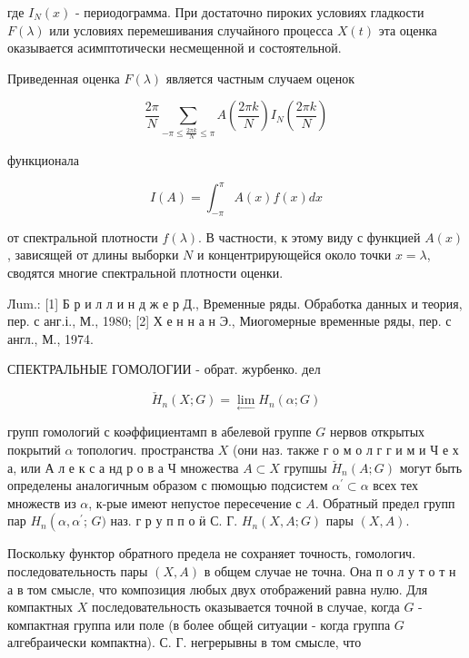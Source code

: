 \documentclass[10pt]{article}
\begin{document}
где $I_{N}(x)$ - периодограмма. При достаточно пироких условиях гладкости $F(\lambda)$ или условиях перемешивания случайного процесса $X(t)$ эта оценка оказывается асимптотически несмещенной и состоятельной.



Приведенная оценка $F(\lambda)$ является частным случаем оценок



\[

\frac{2 \pi}{N} \sum_{-\pi \leqslant \frac{2 \pi k}{N} \leqslant \pi} A\left(\frac{2 \pi k}{N}\right) I_{N}\left(\frac{2 \pi k}{N}\right)

\]



функционала



\[

I(A)=\int_{-\pi}^{\pi} A(x) f(x) d x

\]



от спектральной плотности $f(\lambda)$. В частности, к этому виду с функцией $A(x)$, зависящей от длины выборки $N$ и концентрирующейся около точки $x=\lambda$, сводятся многие спектральной плотности оценки.



Лum.: [1] Б р и л л и н д ж е р Д., Временные ряды. Обработка данных и теория, пер. с анг.і., М., 1980; [2] Х е н н а н Э., Миогомерные временные ряды, пер. с англ., М., 1974.



СПЕКТРАЛЬНЫЕ ГОМОЛОГИИ - обрат. журбенко. дел



\[

\check{H}_{n}(X ; G)=\lim _{\longleftarrow} H_{n}(\alpha ; G)

\]



групп гомологий с коәффициентамп в абелевой группе $G$ нервов открытых покрытий $\alpha$ топологич. пространства $X$ (они наз. также г о м о л г г и м и Ч е х а, или А л е к с а нд р о в а Ч множества $A \subset X$ групшы $\breve{H}_{n}(A ; G)$ могут быть определены аналогичным образом с пюмощью подсистем $\alpha^{\prime} \subset \alpha$ всех тех множеств из $\alpha$, к-рые имеют непустое пересечение с $A$. Обратный предел групп пар $H_{n}\left(\alpha, \alpha^{\prime}\right.$; $G)$ наз. г р у п п о ӥ С. Г. $H_{n}(X, A ; G)$ пары $(X, A)$.



Поскольку функтор обратного предела не сохраняет точность, гомологич. последовательность пары $(X, A)$ в общем случае не точна. Она п о л у т о т н а в том смысле, что композиция любых двух отображений равна нулю. Для компактных $X$ последовательность оказывается точной в случае, когда $G$ - компактная группа или поле (в более общей ситуации - когда группа $G$ алгебраически компактна). С. Г. негрерывны в том смысле, что
\end{document}
